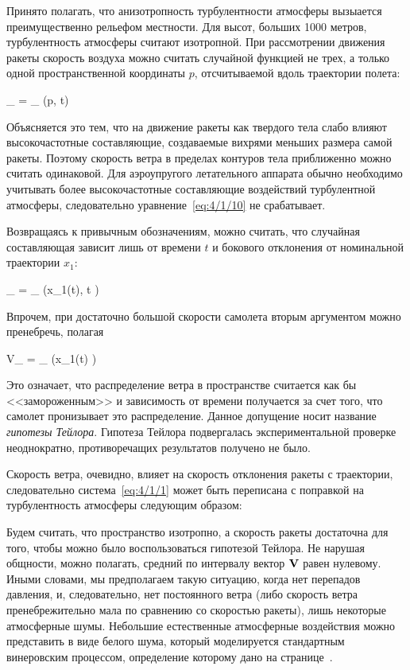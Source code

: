 Принято полагать, что анизотропность турбулентности атмосферы вызыается преимущественно рельефом местности. Для высот, больших 1000 метров, турбулентность атмосферы считают изотропной. При рассмотрении движения ракеты скорость воздуха можно считать случайной функцией не трех, а только одной пространственной координаты $p$, отсчитываемой вдоль траектории полета:

	_{} = _{} (p, t) 
\eeq

Объясняется это тем, что на движение ракеты как твердого тела слабо влияют высокочастотные составляющие\cite{KRASOVSKY}, создаваемые вихрями меньших размера самой ракеты. Поэтому скорость ветра в пределах контуров тела приближенно можно считать одинаковой. Для аэроупругого летательного аппарата обычно необходимо учитывать более высокочастотные составляющие воздействий турбулентной атмосферы, следовательно уравнение~\ref{eq:4/1/10} не срабатывает.

Возвращаясь к привычным обозначениям, можно считать, что случайная составляющая зависит лишь от времени $t$ и бокового отклонения от номинальной траектории $x_1$:

	_{} = _{} \bigl(x_1(t), t \bigr) 
\eeq

Впрочем, при достаточно большой скорости самолета вторым аргументом можно пренебречь, полагая

	V_{} = _{} \bigl(x_1(t) \bigr) 
\eeq

Это означает, что распределение ветра в пространстве считается как бы <<замороженным>> и зависимость от времени получается за счет того, что самолет пронизывает это распределение. Данное допущение носит название \emph{гипотезы Тейлора}\cite{MONIN}. Гипотеза Тейлора подвергалась экспериментальной проверке неоднократно, противоречащих результатов получено не было.

Скорость ветра, очевидно, влияет на скорость отклонения ракеты с траектории, следовательно система~\vref{eq:4/1/1} может быть переписана с поправкой на турбулентность атмосферы следующим образом:

\eeq

Будем считать, что пространство изотропно, а скорость ракеты достаточна для того, чтобы можно было воспользоваться гипотезой Тейлора. Не нарушая общности, можно полагать, средний по интервалу вектор $\mathbf{V}$ равен нулевому. Иными словами, мы предполагаем такую ситуацию, когда нет перепадов давления, и, следовательно, нет постоянного ветра (либо скорость ветра пренебрежительно мала по сравнению со скоростью ракеты), лишь некоторые атмосферные шумы. Небольшие естественные атмосферные воздействия можно представить в виде белого шума, который моделируется стандартным винеровским процессом, определение которому дано на странице~\pageref{df:6}.

